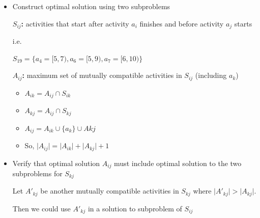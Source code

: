 \documentclass[12pt]{article}
\begin{document}
\begin{enumerate}[1.]
\begin{itemize}
\begin{itemize}
\begin{enumerate}[1.]
                \begin{itemize}
                    \item Construct optimal solution using two subproblems

                    \begin{mdframed}

                    \textbf{$S_{ij}$:} activities that start after activity $a_i$ finishes and before
                    activity $a_j$ starts

                    \bigskip

                    i.e.

                    \bigskip

                    $S_{19} = \{a_4 = [5,7), a_6 = [5, 9), a_7 = [6, 10)\}$

                    \bigskip

                    \textbf{$A_{ij}$:} maximum set of mutually compatible activities in $S_{ij}$ (including $a_k$)

                    \begin{itemize}
                        \item $A_{ik} = A_{ij} \cap S_{ik}$
                        \item $A_{kj} = A_{ij} \cap S_{kj}$
                        \item $A_{ij} = A_{ik} \cup \{a_k\} \cup A{kj}$
                        \item So, $\lvert A_{ij} \rvert  = \lvert A_{ik} \rvert + \lvert A_{kj} \rvert + 1$
                    \end{itemize}

                    \end{mdframed}

                    \item Verify that optimal solution $A_{ij}$ must include optimal solution to the two subproblems
                    for  $S_{kj}$

                    \begin{mdframed}
                        Let $A'_{kj}$ be another mutually compatible activities in $S_{kj}$ where $\lvert A'_{kj} \rvert > \lvert A_{kj} \rvert$.

                        \bigskip

                        Then we could use $A'_{kj}$ in a solution to subproblem of $S_{ij}$

                        \bigskip


\end{mdframed}
\end{itemize}
\end{enumerate}
\end{itemize}
\end{itemize}
\end{enumerate}
\end{document}
